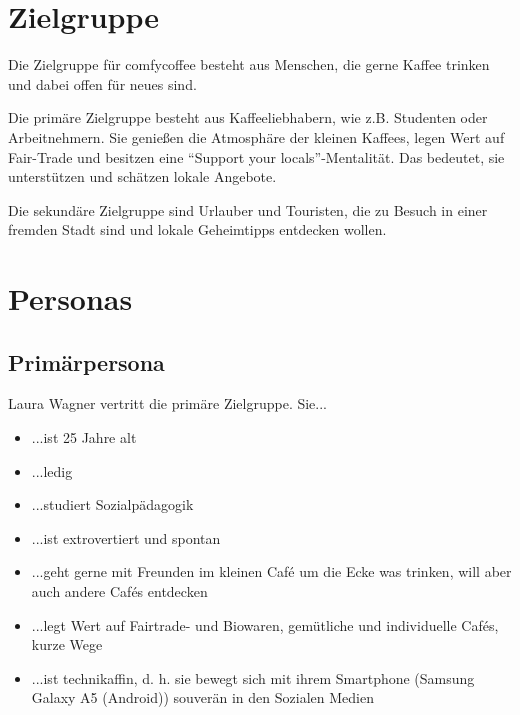 \section{Zielgruppe}
Die Zielgruppe für comfycoffee besteht aus Menschen, die gerne Kaffee trinken und dabei offen für neues sind. 

Die primäre Zielgruppe besteht aus Kaffeeliebhabern, wie z.B. Studenten oder Arbeitnehmern. Sie genießen die Atmosphäre der kleinen Kaffees, legen Wert auf Fair-Trade und besitzen eine ``Support your locals''-Mentalität. Das bedeutet, sie unterstützen und schätzen lokale Angebote.

Die sekundäre Zielgruppe sind Urlauber und Touristen, die zu Besuch in einer fremden Stadt sind und lokale Geheimtipps entdecken wollen.

\section{Personas}
\subsection{Primärpersona}
Laura Wagner vertritt die primäre Zielgruppe. Sie...
\begin{itemize}
	\item ...ist 25 Jahre alt
	\item ...ledig
	\item ...studiert Sozialpädagogik
	\item ...ist extrovertiert und spontan
	\item ...geht gerne mit Freunden im kleinen Café um die Ecke was trinken, will aber auch andere Cafés entdecken
	\item ...legt Wert auf Fairtrade- und Biowaren, gemütliche und individuelle Cafés, kurze Wege
	\item ...ist technikaffin, d. h. sie bewegt sich mit ihrem Smartphone (Samsung Galaxy A5 (Android)) souverän in den Sozialen Medien
\end{itemize}

